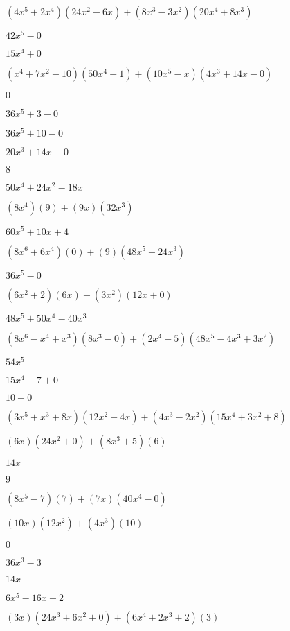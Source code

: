 \documentclass{article}
\begin{document}
\begin{multicols}{2}
$(4x^{5}+2x^{4})(24x^{2}-6x)+(8x^{3}-3x^2)(20x^{4}+8x^{3})$\item $42x^{5}-0$\item $15x^{4}+0$\item $(x^{4}+7x^2-10)(50x^{4}-1)+(10x^{5}-x)(4x^{3}+14x-0)$\item $0$\item $36x^{5}+3-0$\item $36x^{5}+10-0$\item $20x^{3}+14x-0$\item $8$\item $50x^{4}+24x^{2}-18x$\item $(8x^{4})(9)+(9x)(32x^{3})$\item $60x^{5}+10x+4$\item $(8x^{6}+6x^{4})(0)+(9)(48x^{5}+24x^{3})$\item $36x^{5}-0$\item $(6x^2+2)(6x)+(3x^2)(12x+0)$\item $48x^{5}+50x^{4}-40x^{3}$\item $(8x^{6}-x^{4}+x^{3})(8x^{3}-0)+(2x^{4}-5)(48x^{5}-4x^{3}+3x^{2})$\item $54x^{5}$\item $15x^{4}-7+0$\item $10-0$\item $(3x^{5}+x^{3}+8x)(12x^{2}-4x)+(4x^{3}-2x^2)(15x^{4}+3x^{2}+8)$\item $(6x)(24x^{2}+0)+(8x^{3}+5)(6)$\item $14x$\item $9$\item $(8x^{5}-7)(7)+(7x)(40x^{4}-0)$\item $(10x)(12x^{2})+(4x^{3})(10)$\item $0$\item $36x^{3}-3$\item $14x$\item $6x^{5}-16x-2$\item $(3x)(24x^{3}+6x^{2}+0)+(6x^{4}+2x^{3}+2)(3)$\item 
\end{multicols}
\end{document}
